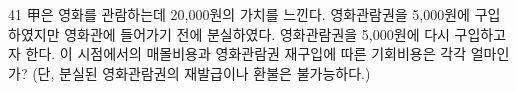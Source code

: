 \begin{question}{41}
甲은 영화를 관람하는데 20,000원의 가치를 느낀다. 영화관람권을 5,000원에 구입하였지만 영화관에 들어가기 전에 분실하였다. 영화관람권을 5,000원에 다시 구입하고자 한다. 이 시점에서의 매몰비용과 영화관람권 재구입에 따른 기회비용은 각각 얼마인가? (단, 분실된 영화관람권의 재발급이나 환불은 불가능하다.)
\par\smallskip
\hspace{1.2cm}\uline{}\hspace{1em}\uline{}\par
\begin{choices}
  \item {}\hspace{1em}
  \item {}\hspace{1em}
  \item {}\hspace{1em}
  \item {}\hspace{1em}
  \item {}\hspace{1em}
\end{choices}
\end{question}
